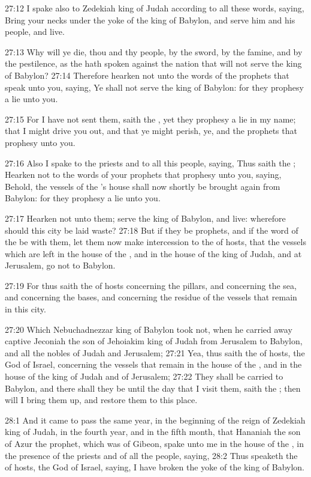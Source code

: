 27:12 I spake also to Zedekiah king of Judah according to all these
words, saying, Bring your necks under the yoke of the king of Babylon,
and serve him and his people, and live.

27:13 Why will ye die, thou and thy people, by the sword, by the
famine, and by the pestilence, as the \LORD hath spoken against the
nation that will not serve the king of Babylon?  27:14 Therefore
hearken not unto the words of the prophets that speak unto you,
saying, Ye shall not serve the king of Babylon: for they prophesy a
lie unto you.

27:15 For I have not sent them, saith the \LORD, yet they prophesy a
lie in my name; that I might drive you out, and that ye might perish,
ye, and the prophets that prophesy unto you.

27:16 Also I spake to the priests and to all this people, saying, Thus
saith the \LORD; Hearken not to the words of your prophets that
prophesy unto you, saying, Behold, the vessels of the \LORD's house
shall now shortly be brought again from Babylon: for they prophesy a
lie unto you.

27:17 Hearken not unto them; serve the king of Babylon, and live:
wherefore should this city be laid waste?  27:18 But if they be
prophets, and if the word of the \LORD be with them, let them now make
intercession to the \LORD of hosts, that the vessels which are left in
the house of the \LORD, and in the house of the king of Judah, and at
Jerusalem, go not to Babylon.

27:19 For thus saith the \LORD of hosts concerning the pillars, and
concerning the sea, and concerning the bases, and concerning the
residue of the vessels that remain in this city.

27:20 Which Nebuchadnezzar king of Babylon took not, when he carried
away captive Jeconiah the son of Jehoiakim king of Judah from
Jerusalem to Babylon, and all the nobles of Judah and Jerusalem; 27:21
Yea, thus saith the \LORD of hosts, the God of Israel, concerning the
vessels that remain in the house of the \LORD, and in the house of the
king of Judah and of Jerusalem; 27:22 They shall be carried to
Babylon, and there shall they be until the day that I visit them,
saith the \LORD; then will I bring them up, and restore them to this
place.

28:1 And it came to pass the same year, in the beginning of the reign
of Zedekiah king of Judah, in the fourth year, and in the fifth month,
that Hananiah the son of Azur the prophet, which was of Gibeon, spake
unto me in the house of the \LORD, in the presence of the priests and
of all the people, saying, 28:2 Thus speaketh the \LORD of hosts, the
God of Israel, saying, I have broken the yoke of the king of Babylon.

